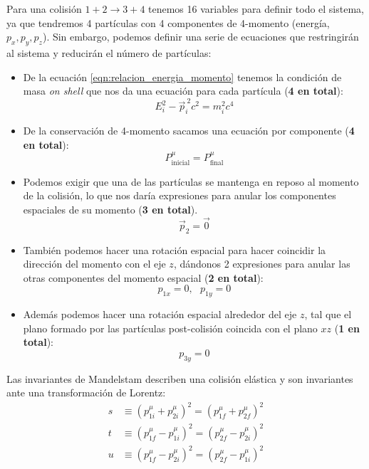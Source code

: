 \documentclass[]{report}
\numberwithin{equation}{section}
\newcommand{\0}{\textcolor{gray}{0}}
\begin{document}
Para una colisión \(1+2\rightarrow 3+4\) tenemos 16 variables para definir todo el sistema, ya que tendremos 4 partículas con 4 componentes de 4-momento (energía, \(p_x,p_y,p_z\)). Sin embargo, podemos definir una serie de ecuaciones que restringirán al sistema y reducirán el número de partículas:
\begin{itemize}
	\item De la ecuación \ref{eqn:relacion_energia_momento} tenemos la condición de masa \textit{on shell} que nos da una ecuación para cada partícula (\textbf{4 en total}):
	\begin{equation*}
		E_i^2 - \vec{p}_i^{\ 2}c^2 = m_i^2c^4
	\end{equation*}
	\item De la conservación de 4-momento sacamos una ecuación por componente (\textbf{4 en total}):
	\begin{equation*}
		P^\mu_{\text{inicial}} = P^\mu_{\text{final}}
	\end{equation*}
	\item Podemos exigir que una de las partículas se mantenga en reposo al momento de la colisión, lo que nos daría expresiones para anular los componentes espaciales de su momento (\textbf{3 en total}).
	\begin{equation*}
		\vec{p}_2 = \vec{0}
	\end{equation*}
	\item También podemos hacer una rotación espacial para hacer coincidir la dirección del momento con el eje \(z\), dándonos 2 expresiones para anular las otras componentes del momento espacial (\textbf{2 en total}):
	\begin{equation*}
		p_{1x} = 0,\ \ \ p_{1y} = 0
	\end{equation*}
	\item Además podemos hacer una rotación espacial alrededor del eje \(z\), tal que el plano formado por las partículas post-colisión coincida con el plano \(xz\) (\textbf{1 en total}):
	\begin{equation*}
		p_{3y} = 0
	\end{equation*}
\end{itemize}

Las invariantes de Mandelstam describen una colisión elástica y son invariantes ante una transformación de Lorentz:
\begin{align}
	s &\equiv (p^\mu_{1i} + p^\mu_{2i})^2 = (p^\mu_{1f} + p^\mu_{2f})^2\\
	t &\equiv (p^\mu_{1f} - p^\mu_{1i})^2 = (p^\mu_{2f} - p^\mu_{2i})^2\\
	u &\equiv (p^\mu_{1f} - p^\mu_{2i})^2 = (p^\mu_{2f} - p^\mu_{1i})^2
\end{align}
\end{document}
